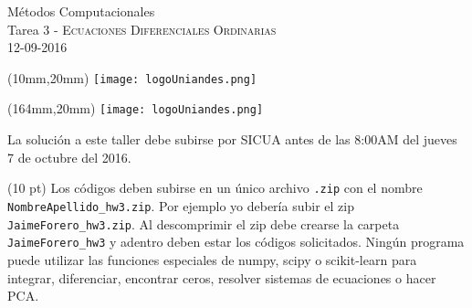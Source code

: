 \documentclass[11pt,letterpaper]{exam}
\begin{document}
\begin{center}
{\Large M\'etodos Computacionales} \\
Tarea 3 - \textsc{Ecuaciones Diferenciales Ordinarias}\\
12-09-2016\\
\end{center}

\begin{textblock*}{40mm}(10mm,20mm)
  \texttt{[image: logoUniandes.png]}
\end{textblock*}

\begin{textblock*}{40mm}(164mm,20mm)
  \texttt{[image: logoUniandes.png]}
\end{textblock*}

\vspace{0.3cm}


\noindent
La solución a este taller debe subirse por SICUA antes de las 8:00AM
del jueves 7 de octubre del 2016. 

\noindent
(10 pt) Los c\'odigos deben subirse en un
\'unico archivo \verb".zip" con el nombre
\verb"NombreApellido_hw3.zip". Por ejemplo yo deber\'ia subir el zip
\verb"JaimeForero_hw3.zip". Al descomprimir el zip debe crearse la
carpeta \verb"JaimeForero_hw3" y adentro deben estar los c\'odigos
solicitados.
Ning\'un programa puede utilizar las funciones especiales de numpy,
scipy o scikit-learn para integrar, diferenciar, encontrar ceros,
resolver sistemas de ecuaciones o hacer PCA.

\vspace{0.3cm}
\end{document}
